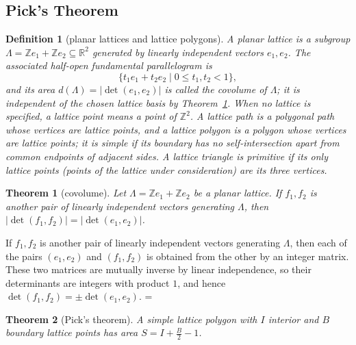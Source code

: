 \documentclass[11pt]{article}
\makeatletter
\let\nt@closedisplay\]
\def\nt@guardedclose{\@ifnextchar\par{\nt@closeafterpar}{\@ifnextchar\end{\postdisplaypenalty\@M\nt@closedisplay}{\nt@closedisplay}}}
\def\nt@closeafterpar\par{\@ifnextchar\par{\nt@closeafterpar}{\@ifnextchar\end{\postdisplaypenalty\@M\nt@closedisplay\par}{\nt@closedisplay\par}}}
\renewenvironment{proof}[1][\proofname]{\par
  \pushQED{\qed}\normalfont\topsep\medskipamount\edef\nt@afterproof{\@endparpenalty=\the\@endparpenalty\relax}\@beginparpenalty\@M\@endparpenalty\@M\let\]\nt@guardedclose\trivlist\item[]\textit{#1\@addpunct{.}} \ignorespaces}{\ifvmode\addpenalty\@M\fi\popQED\nt@afterproof\endtrivlist\@endpefalse}
\theoremstyle{ntstyle}
\newtheorem{theorem}{Theorem}[subsection]
\newtheorem{definition}{Definition}[subsection]
\makeatother
\begin{document}
\subsection{Pick's Theorem}

\begin{definition}[planar lattices and lattice polygons]\label{def:10.8.1}\label{def:planar-lattices-and-lattice-polygons}
  A planar lattice is a subgroup
  $\Lambda=\mathbb{Z}e_1+\mathbb{Z}e_2\subseteq\mathbb{R}^2$ generated by
  linearly independent vectors $e_1,e_2$. The associated half-open
  fundamental parallelogram is
  \[
    \{t_1e_1+t_2e_2\mid 0\le t_1,t_2<1\},
  \]
  and its area $d(\Lambda)=|\det(e_1,e_2)|$ is called the covolume of
  $\Lambda$; it is independent of the chosen lattice basis by
  Theorem~\ref{thm:10.8.1}. When no lattice
  is specified, a lattice point means a point of $\mathbb{Z}^2$. A lattice
  path is a polygonal path whose vertices are lattice points, and a lattice
  polygon is a polygon whose vertices are lattice points; it is simple if
  its boundary has no self-intersection apart from common endpoints of
  adjacent sides. A lattice triangle is primitive if its only lattice
  points (points of the lattice under consideration) are its three vertices.

\end{definition}

\begin{theorem}[covolume]\label{thm:10.8.1}\label{thm:covolume}
  Let $\Lambda=\mathbb{Z}e_1+\mathbb{Z}e_2$ be a planar lattice. If $f_1,f_2$ is
  another pair of linearly independent vectors generating $\Lambda$, then
  $|\det(f_1,f_2)|=|\det(e_1,e_2)|$.

\end{theorem}

\begin{proof} If $f_1,f_2$ is
  another pair of linearly independent vectors generating $\Lambda$, then
each of the pairs $(e_1,e_2)$ and $(f_1,f_2)$ is obtained from the other
by an integer matrix. These two matrices are mutually inverse by linear
independence, so their determinants are integers with product $1$, and
hence $\det(f_1,f_2)=\pm\det(e_1,e_2)$.
\end{proof}

\begin{theorem}[Pick's theorem]\label{thm:10.8.2}\label{thm:pick-theorem}
  A simple lattice polygon
  with $I$ interior and $B$ boundary lattice points has area $S = I + \tfrac{B}{2} - 1$.

\end{theorem}
\end{document}
